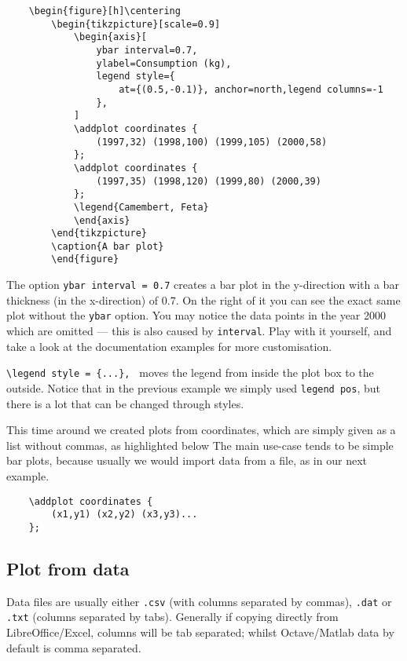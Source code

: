 \begin{lstlisting}
    \begin{figure}[h]\centering
        \begin{tikzpicture}[scale=0.9]
            \begin{axis}[
                ybar interval=0.7,
                ylabel=Consumption (kg),
                legend style={
                    at={(0.5,-0.1)}, anchor=north,legend columns=-1
                },
            ]
            \addplot coordinates {
                (1997,32) (1998,100) (1999,105) (2000,58) 
            };
            \addplot coordinates {
                (1997,35) (1998,120) (1999,80) (2000,39) 
            };
            \legend{Camembert, Feta}
            \end{axis}
        \end{tikzpicture}
        \caption{A bar plot}
        \end{figure}  
\end{lstlisting}
The option \verb|ybar interval = 0.7| creates a bar plot in the y-direction with a bar thickness (in the x-direction) of 0.7.
On the right of it you can see the exact same plot without the \verb|ybar| option.
You may notice the data points in the year 2000 which are omitted --- this is also caused by \verb|interval|.
Play with it yourself, and take a look at the documentation examples for more customisation.

\verb|\legend style = {...}, | moves the legend from inside the plot box to the outside.
Notice that in the previous example we simply used \verb|legend pos|, but there is a lot that can be changed through styles.

This time around we created plots from coordinates, which are simply given as a list without commas, as highlighted below
The main use-case tends to be simple bar plots, because usually we would import data from a file, as in our next example.
\begin{lstlisting}
    \addplot coordinates {
        (x1,y1) (x2,y2) (x3,y3)...
    };
\end{lstlisting}

\subsection{Plot from data}
Data files are usually either \texttt{.csv} (with columns separated by commas), \texttt{.dat} or \texttt{.txt} (columns separated by tabs).
Generally if copying directly from LibreOffice/Excel, columns will be tab separated; whilst Octave/Matlab data by default is comma separated.

